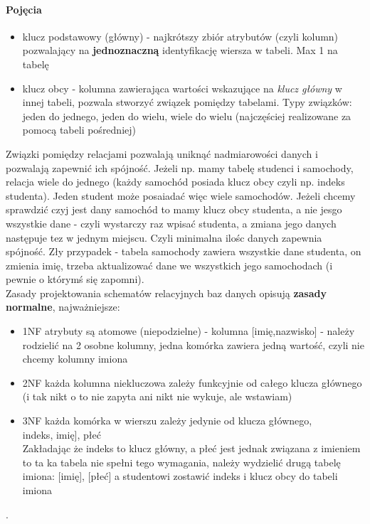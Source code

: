 \documentclass[]{report}
\begin{document}
\paragraph{Pojęcia}
\begin{itemize}
	\item klucz podstawowy (główny) - najkrótszy zbiór atrybutów (czyli kolumn) pozwalający na \textbf{jednoznaczną} identyfikację wiersza w tabeli. Max 1 na tabelę
	\item klucz obcy - kolumna zawierająca wartości wskazujące na \textit{klucz główny} w innej tabeli, pozwala stworzyć związek pomiędzy tabelami. Typy związków: jeden do jednego, jeden do wielu, wiele do wielu (najczęściej realizowane za pomocą tabeli pośredniej)
\end{itemize}
Związki pomiędzy relacjami pozwalają uniknąć nadmiarowości danych i pozwalają zapewnić ich spójność. Jeżeli np. mamy tabelę studenci i samochody, relacja wiele do jednego (każdy samochód posiada klucz obcy czyli np. indeks studenta). Jeden student może posaiadać więc wiele samochodów. Jeżeli chcemy sprawdzić czyj jest dany samochód to mamy klucz obcy studenta, a nie jesgo wszystkie dane - czyli wystarczy raz wpisać studenta, a zmiana jego danych następuje tez w jednym miejscu. Czyli minimalna ilośc danych zapewnia spójność. Zły przypadek - tabela samochody zawiera wszystkie dane studenta, on zmienia imię, trzeba aktualizować dane we wszystkich jego samochodach (i pewnie o którymś się zapomni).\\
Zasady projektowania schematów relacyjnych baz danych opisują \textbf{zasady normalne}, najważniejsze:
\begin{itemize}
	\item 1NF atrybuty są atomowe (niepodzielne) - kolumna [imię,nazwisko] - należy rodzielić na 2 osobne kolumny, jedna komórka zawiera jedną wartość, czyli nie chcemy kolumny imiona
		\item 2NF   każda kolumna niekluczowa zależy funkcyjnie od całego klucza głównego  (i tak nikt o to nie zapyta ani nikt nie wykuje, ale wstawiam)
	\item 3NF każda komórka w wierszu zależy jedynie od klucza głównego, \\
	\lbrack indeks\rbrack, \lbrack imię\rbrack], \lbrack płeć\rbrack  \\
	Zakładając że indeks to klucz główny, a płeć jest jednak związana z imieniem to ta ka tabela nie spełni tego wymagania, należy wydzielić drugą tabelę imiona: [imię], [płeć] a studentowi zostawić indeks i klucz obcy do tabeli imiona
\end{itemize} .
\end{document}
